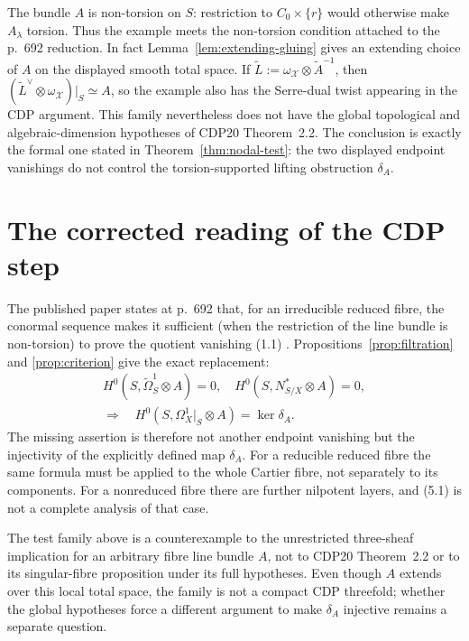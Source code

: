 \begin{remark}
\label{rem:scope}
The bundle $A$ is non-torsion on $S$: restriction to
\(C_0\times\{r\}\) would otherwise make $A_\lambda$ torsion.  Thus the
example meets the non-torsion condition attached to the p.~692 reduction.
In fact Lemma~\ref{lem:extending-gluing} gives an extending choice of $A$ on
the displayed smooth total space.  If $\widetilde L:=\omega_{\mathcal X}\otimes
\widetilde A^{-1}$, then
$(\widetilde L^\vee\otimes\omega_{\mathcal X})|_S\simeq A$, so the example
also has the Serre-dual twist appearing in the CDP argument.  This family
nevertheless does not have
the global topological and algebraic-dimension hypotheses of CDP20
Theorem~2.2.  The conclusion is exactly the formal one stated in
Theorem~\ref{thm:nodal-test}: the two displayed endpoint vanishings do not
control the torsion-supported lifting obstruction $\delta_A$.
\end{remark}

\section{The corrected reading of the CDP step}

The published paper states at p.~692 that, for an irreducible reduced fibre,
the conormal sequence makes it sufficient (when the restriction of the line
bundle is non-torsion) to prove the quotient vanishing (1.1)
\cite{CDP2020}.  Propositions~\ref{prop:filtration} and
\ref{prop:criterion} give the exact replacement:
\[
\begin{gathered}
 H^0(S,\widetilde\Omega^1_S\otimes A)=0,
 \quad H^0(S,N^*_{S/X}\otimes A)=0,\\[-2pt]
 \Longrightarrow\quad
 H^0(S,\Omega^1_X|_S\otimes A)=\ker\delta_A.
\end{gathered}
\tag{5.1}
\]
The missing assertion is therefore not another endpoint vanishing but the
injectivity of the explicitly defined map $\delta_A$.  For a reducible
reduced fibre the same formula must be applied to the whole Cartier fibre,
not separately to its components.  For a nonreduced fibre there are further
nilpotent layers, and (5.1) is not a complete analysis of that case.

The test family above is a counterexample to the unrestricted three-sheaf
implication for an arbitrary fibre line bundle $A$, not to CDP20
Theorem~2.2 or to its singular-fibre proposition under its full hypotheses.
Even though $A$ extends over this local total space, the family is not a
compact CDP threefold; whether the global hypotheses force a different
argument to make $\delta_A$ injective remains a separate question.

